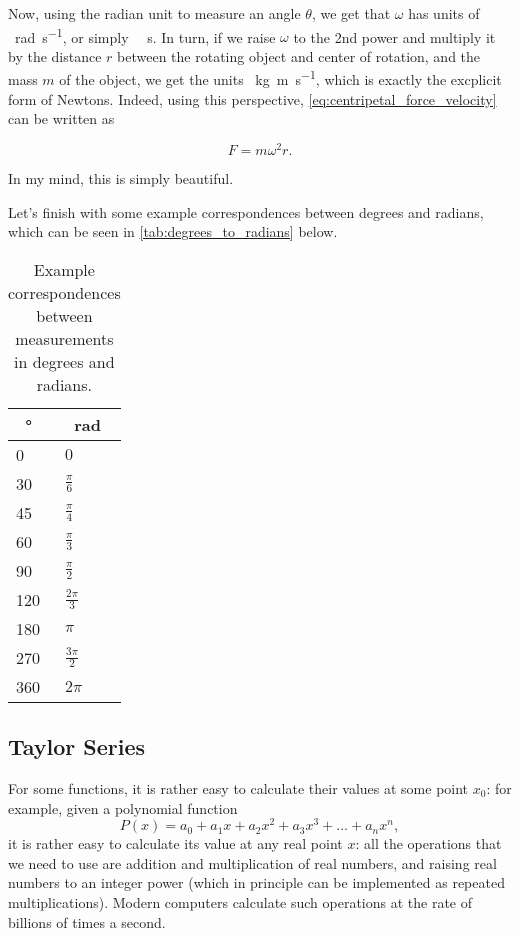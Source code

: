 Now, using the radian unit to measure an angle $\theta$, we get that $\omega$ has units of \SI{}{\radian\per\second}, or simply \SI{}{\per\second}. In turn, if we raise $\omega$ to the 2nd power and multiply it by the distance $r$ between the rotating object and center of rotation, and the mass $m$ of the object, we get the units \SI{}{\kilo\gram\meter\per\second}, which is exactly the excplicit form of Newtons. Indeed, using this perspective, \autoref{eq:centripetal_force_velocity} can be written as

\begin{equation}
  F = m\omega^{2}r.
  \label{eq:centripetal_force_angular_velocity}
\end{equation}

In my mind, this is simply beautiful.

Let's finish with some example correspondences between degrees and radians, which can be seen in \autoref{tab:degrees_to_radians} below.

\begin{table}
  \caption{Example correspondences between measurements in degrees and radians.}
  \label{tab:degrees_to_radians}
  \begin{center}
    {
      \renewcommand{\arraystretch}{1.2}
      \begin{tabular}[c]{l|l}
        \toprule
        \SI{}{\degree} & \SI{}{\radian}\\
        \midrule
        0   & $0$ \\
        30  & $\frac{\pi}{6}$ \\
        45  & $\frac{\pi}{4}$ \\
        60  & $\frac{\pi}{3}$ \\
        90  & $\frac{\pi}{2}$ \\
        120 & $\frac{2\pi}{3}$ \\
        180 & $\pi$ \\
        270 & $\frac{3\pi}{2}$ \\
        360 & $2\pi$ \\
        \bottomrule
      \end{tabular}
    }
  \end{center}
\end{table}

\subsection{Taylor Series}
For some functions, it is rather easy to calculate their values at some point $x_{0}$: for example, given a polynomial function
\begin{equation}
  P(x) = a_{0} + a_{1}x + a_{2}x^{2} + a_{3}x^{3} + \dots + a_{n}x^{n},
  \label{eq:basic_polynomial}
\end{equation}
it is rather easy to calculate its value at any real point $x$: all the operations that we need to use are addition and multiplication of real numbers, and raising real numbers to an integer power (which in principle can be implemented as repeated multiplications). Modern computers calculate such operations at the rate of billions of times a second.


